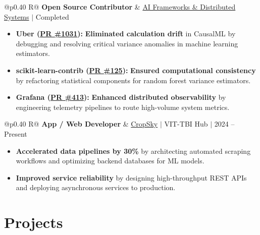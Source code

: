 \documentclass[a4paper,11pt]{article}
\newcommand{\subheading}[1]{\textbf{#1}}
\newcommand{\meta}[1]{{\fontsize{10}{12}\selectfont\textcolor[HTML]{3A3A3A}{#1}}}
\newcommand{\ulink}[2]{\href{#1}{#2}}
\begin{document}
\begin{tabularx}{\linewidth}{@{}p{0.40\linewidth} R@{}}
\subheading{Open Source Contributor} & \meta{\ulink{https://github.com/su-jin1425/My-Open-Source-Contributions}{AI Frameworks \& Distributed Systems} $|$ Completed}
\end{tabularx}
\begin{itemize}[nosep, leftmargin=1.5em, itemsep=2pt, topsep=2pt]
  \item {\color[HTML]{0A0A0A}\fontsize{11}{14}\selectfont \textbf{Uber (\ulink{https://github.com/uber/causalml/pull/1031}{PR \#1031}):} \textbf{Eliminated calculation drift} in CausalML by debugging and resolving critical variance anomalies in machine learning estimators.}
  \item {\color[HTML]{0A0A0A}\fontsize{11}{14}\selectfont \textbf{scikit-learn-contrib (\ulink{https://github.com/scikit-learn-contrib/forest-confidence-interval/pull/125}{PR \#125}):} \textbf{Ensured computational consistency} by refactoring statistical components for random forest variance estimators.}
  \item {\color[HTML]{0A0A0A}\fontsize{11}{14}\selectfont \textbf{Grafana (\ulink{https://github.com/grafana/alloy-scenarios/pull/413}{PR \#413}):} \textbf{Enhanced distributed observability} by engineering telemetry pipelines to route high-volume system metrics.}
\end{itemize}

\begin{tabularx}{\linewidth}{@{}p{0.40\linewidth} R@{}}
\subheading{App / Web Developer} & \meta{\ulink{https://sites.google.com/view/cropsky/home}{CropSky} $|$ VIT-TBI Hub $|$ 2024 -- Present}
\end{tabularx}
\begin{itemize}[nosep, leftmargin=1.5em, itemsep=2pt, topsep=2pt]
  \item {\color[HTML]{0A0A0A}\fontsize{11}{14}\selectfont \textbf{Accelerated data pipelines by 30\%} by architecting automated scraping workflows and optimizing backend databases for ML models.}
  \item {\color[HTML]{0A0A0A}\fontsize{11}{14}\selectfont \textbf{Improved service reliability} by designing high-throughput REST APIs and deploying asynchronous services to production.}
\end{itemize}

\section{Projects}
\vspace{2pt}
\end{document}
